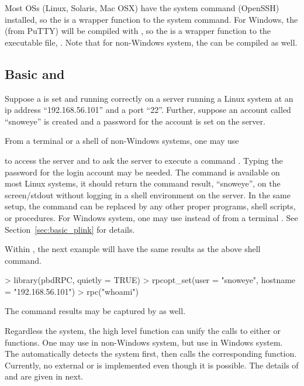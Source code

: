 Most OSs (Linux, Solaris, Mac OSX) have the system command  (OpenSSH)
installed, so the
 is a wrapper function to the system  command.
For Windows, the  (from PuTTY) will be compiled with
, so the  is a wrapper function to the
executable file, .
Note that for non-Windows system, the  can be compiled as well.


\subsection[Basic \code{ssh} and \code{rpc()}]{Basic  and }
\label{sec:basic_rpc}

Suppose a  is set and running correctly on a server running a Linux
system at an ip address ``192.168.56.101'' and a port ``22''.
Further, suppose an account
called ``snoweye'' is created and a password for the account is set on
the server.

From a terminal or a shell of non-Windows systems, one may use
to access the server and to ask the server to execute a command .
Typing the password for the login account may be needed.
The command  is available on most Linux systems, it should
return the command result, ``snoweye'', on the screen/stdout without
logging in a shell environment on the server.
In the same setup, the command  can be replaced
by any other proper programs, shell scripts, or procedures.
For Windows system, one may use  instead of 
from a terminal . See Section~\ref{sec:basic_plink} for details.

Within , the next example will have the
same results as the above shell command.
\begin{Code}[title=Basic \code{rpc()} in \pkg{pbdRPC} and \proglang{R}]
> library(pbdRPC, quietly = TRUE)
> rpcopt_set(user = "snoweye", hostname = "192.168.56.101")
> rpc("whoami")
\end{Code}
The command results may be captured by  as well.

Regardless the system,
the high level function  can unify the calls to
either  or  functions.
One may use  in non-Windows system, but
use  in Windows system.
The  automatically
detects the system first, then calls the corresponding function.
Currently, no external  or  is implemented
even though it is possible.
The details of  and  are given in next.


